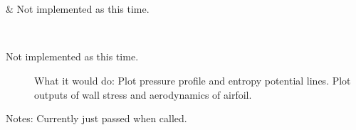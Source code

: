 \documentclass[letterpaper,10pt,english]{sphinxmanual}
\begin{document}
\begin{savenotes}\sphinxatlongtablestart\begin{longtable}[c]{}
\hline

\endfirsthead

%
{}\\
\hline

\endhead

\hline
{}\\
\endfoot

\endlastfoot

\sphinxAtStartPar
{\hyperref[\detokenize{autoapi/flo103_PostProcessor/index:flo103_PostProcessor.flo103_PostProcessor}]{}}
&
\sphinxAtStartPar
Not implemented as this time.
\\
\hline
\end{longtable}\sphinxatlongtableend\end{savenotes}

\begin{fulllineitems}
\label{\detokenize{autoapi/flo103_PostProcessor/index:flo103_PostProcessor.flo103_PostProcessor}}~\begin{description}
\item[{Not implemented as this time.}] \leavevmode
\sphinxAtStartPar
What it would do:
Plot pressure profile and entropy potential lines.
Plot outputs of wall stress and aerodynamics of airfoil.

\end{description}


\begin{fulllineitems}
\end{fulllineitems}


\sphinxAtStartPar
Notes:
Currently just passed when called.

\end{fulllineitems}
\end{document}
